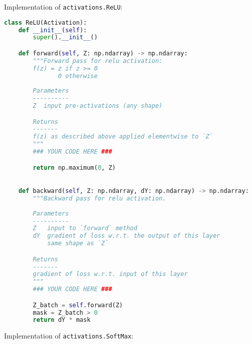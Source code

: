 Implementation of \texttt{activations.ReLU}:

\begin{lstlisting}[language=Python]
class ReLU(Activation):
    def __init__(self):
        super().__init__()

    def forward(self, Z: np.ndarray) -> np.ndarray:
        """Forward pass for relu activation:
        f(z) = z if z >= 0
               0 otherwise
        
        Parameters
        ----------
        Z  input pre-activations (any shape)

        Returns
        -------
        f(z) as described above applied elementwise to `Z`
        """
        ### YOUR CODE HERE ###

        return np.maximum(0, Z)
    

    def backward(self, Z: np.ndarray, dY: np.ndarray) -> np.ndarray:
        """Backward pass for relu activation.
        
        Parameters
        ----------
        Z   input to `forward` method
        dY  gradient of loss w.r.t. the output of this layer
            same shape as `Z`

        Returns
        -------
        gradient of loss w.r.t. input of this layer
        """
        ### YOUR CODE HERE ###

        Z_batch = self.forward(Z)
        mask = Z_batch > 0
        return dY * mask

\end{lstlisting}

Implementation of \texttt{activations.SoftMax}:

